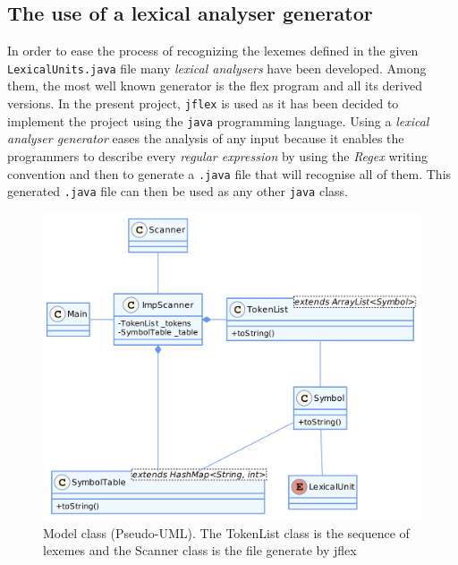 \documentclass[a4paper,11pt]{article}
\begin{document}
  \subsection{The use of a lexical analyser generator}
    In order to ease the process of recognizing the lexemes defined in the given \verb|LexicalUnits.java| file many \textit{lexical analysers} have been developed. Among them, the most well known generator is the flex program and all its derived versions. In the present project, \verb|jflex| is used as it has been decided to implement the project using the \verb|java| programming language. Using a \textit{lexical analyser generator} eases the analysis of any input because it enables the programmers to describe every \textit{regular expression} by using the \textit{Regex} writing convention and then to generate a \verb|.java| file that will recognise all of them. This generated \verb|.java| file can then be used as any other \verb|java| class.
    \begin{figure}[h]
      \includegraphics[scale=0.15]{./img/class_diag.png}
      \centering
      \caption{Model class (Pseudo-UML). The TokenList class is the sequence of lexemes and the Scanner class is the file generate by jflex}
    \end{figure}
  
\end{document}
